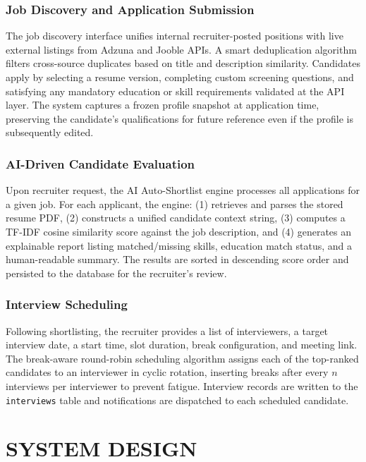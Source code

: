 \documentclass[12pt,a4paper]{report}
\begin{document}
\subsection{Job Discovery and Application Submission}
The job discovery interface unifies internal recruiter-posted positions with live external listings from Adzuna and Jooble APIs. A smart deduplication algorithm filters cross-source duplicates based on title and description similarity. Candidates apply by selecting a resume version, completing custom screening questions, and satisfying any mandatory education or skill requirements validated at the API layer. The system captures a frozen profile snapshot at application time, preserving the candidate's qualifications for future reference even if the profile is subsequently edited.

\subsection{AI-Driven Candidate Evaluation}
Upon recruiter request, the AI Auto-Shortlist engine processes all applications for a given job. For each applicant, the engine: (1) retrieves and parses the stored resume PDF, (2) constructs a unified candidate context string, (3) computes a TF-IDF cosine similarity score against the job description, and (4) generates an explainable report listing matched/missing skills, education match status, and a human-readable summary. The results are sorted in descending score order and persisted to the database for the recruiter's review.

\subsection{Interview Scheduling}
Following shortlisting, the recruiter provides a list of interviewers, a target interview date, a start time, slot duration, break configuration, and meeting link. The break-aware round-robin scheduling algorithm assigns each of the top-ranked candidates to an interviewer in cyclic rotation, inserting breaks after every $n$ interviews per interviewer to prevent fatigue. Interview records are written to the \texttt{interviews} table and notifications are dispatched to each scheduled candidate.

\chapter{SYSTEM DESIGN}
\end{document}
